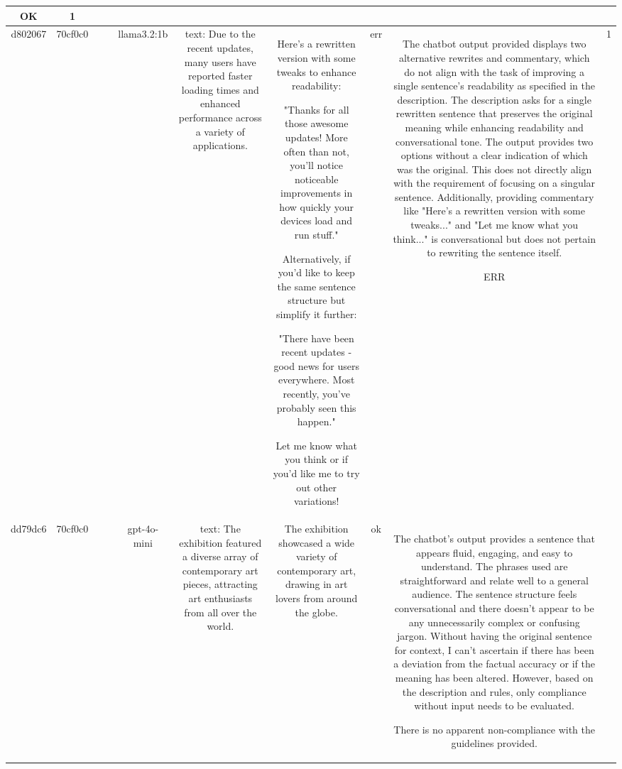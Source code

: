 \begin{table}[h!]
\begin{tabular}{|c|c|c|c|c|c|c|c|c|c|}
OK & 1\\
\hline
d802067 & 70cf0c0 &  &  & llama3.2:1b & text: Due to the recent updates, many users have reported faster loading times and enhanced performance across a variety of applications. & Here's a rewritten version with some tweaks to enhance readability:

"Thanks for all those awesome updates! More often than not, you'll notice noticeable improvements in how quickly your devices load and run stuff."

Alternatively, if you'd like to keep the same sentence structure but simplify it further:

"There have been recent updates - good news for users everywhere. Most recently, you've probably seen this happen."

Let me know what you think or if you'd like me to try out other variations! & err & The chatbot output provided displays two alternative rewrites and commentary, which do not align with the task of improving a single sentence's readability as specified in the description. The description asks for a single rewritten sentence that preserves the original meaning while enhancing readability and conversational tone. The output provides two options without a clear indication of which was the original. This does not directly align with the requirement of focusing on a singular sentence. Additionally, providing commentary like "Here's a rewritten version with some tweaks..." and "Let me know what you think..." is conversational but does not pertain to rewriting the sentence itself.

ERR & 1\\
\hline
dd79dc6 & 70cf0c0 &  &  & gpt-4o-mini & text: The exhibition featured a diverse array of contemporary art pieces, attracting art enthusiasts from all over the world. & The exhibition showcased a wide variety of contemporary art, drawing in art lovers from around the globe. & ok & The chatbot's output provides a sentence that appears fluid, engaging, and easy to understand. The phrases used are straightforward and relate well to a general audience. The sentence structure feels conversational and there doesn’t appear to be any unnecessarily complex or confusing jargon. Without having the original sentence for context, I can't ascertain if there has been a deviation from the factual accuracy or if the meaning has been altered. However, based on the description and rules, only compliance without input needs to be evaluated.

There is no apparent non-compliance with the guidelines provided.


\end{tabular}
\end{table}
